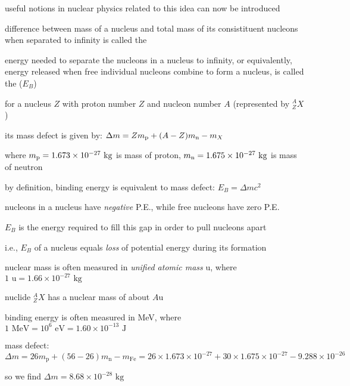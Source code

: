 useful notions in nuclear physics related to this idea can now be introduced

\begin{ilight}
	difference between mass of a nucleus and total mass of its consistituent nucleons when separated to infinity is called the 
\end{ilight}

\begin{ilight}
	energy needed to separate the nucleons in a nucleus to infinity, or equivalently, energy released when free individual nucleons combine to form a nucleus, is called the  ($E_B$)
\end{ilight}

\cmt for a nucleus $Z$ with proton number $Z$ and nucleon number $A$ (represented by $^A_Z X$)

its mass defect is given by: $\Delta m = Z m_\text{p} + (A-Z)m_\text{n} -m_X$

where $m_\text{p} = 1.673 \times 10^{-27} \text{ kg}$ is mass of proton, $m_\text{n} = 1.675 \times 10^{-27} \text{ kg}$ is mass of neutron

\cmt by definition, binding energy is equivalent to mass defect: $\boxed{E_B = \Delta m c^2}$

\cmt nucleons in a nucleus have \emph{negative} P.E., while free  nucleons have zero P.E.

$E_B$ is the energy required to fill this gap in order to pull nucleons apart

i.e., $E_B$ of a nucleus equals \emph{loss} of potential energy during its formation

\cmt nuclear mass is often measured in \emph{unified atomic mass} u, where $\boxed{1 \text{ u} = 1.66\times10^{-27} \text{ kg}}$

nuclide $^A_Z X$ has a nuclear mass of about $A\text{u}$

\cmt binding energy is often measured in MeV, where $\boxed{1 \text{ MeV} = 10^6 \text{ eV} = 1.60\times10^{-13} \text{ J}}$ 


\sol mass defect: $\Delta m = 26m_\text{p} + (56-26)m_\text{n} - m_\text{Fe} = 26\times 1.673\times10^{-27} + 30 \times1.675\times10^{-27} - 9.288 \times 10^{-26}$

so we find $\Delta m = 8.68 \times 10^{-28} \text{ kg}$

